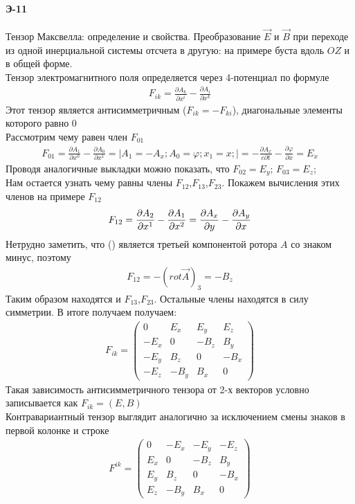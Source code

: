 \documentclass[__main__.tex]{subfiles}
\begin{document}
\paragraph{Э-11}
Тензор Максвелла: определение и свойства. Преобразование $\vec E$ и $\vec B$ при переходе из одной инерциальной системы отсчета в другую: на примере буста вдоль $OZ$ и в общей форме.\\

Тензор электромагнитного поля определяется через 4-потенциал по формуле
\begin{gather*}
	F_{ik} = \frac{\partial A_k}{\partial x^i}-\frac{\partial A_i}{\partial x^k}
\end{gather*}
Этот тензор является антисимметричным ($F_{ik}=-F_{ki}$), диагональные элементы которого равно 0\\
Рассмотрим чему равен член $F_{01}$
\begin{gather*}
F_{01} = \frac{\partial A_1}{\partial x^0}-\frac{\partial A_0}{\partial x^1}=\bigg|A_1=-A_x;A_0=\varphi;x_1=x;\bigg|= -\frac{\partial A_x}{c\partial t}-\frac{\partial \varphi}{\partial x} = E_x
\end{gather*}
Проводя аналогичные выкладки можно показать, что $\displaystyle F_{02} = E_y$; $\displaystyle F_{03} = E_z$;\\
Нам остается узнать чему равны члены $F_{12}$,$F_{13}$,$F_{23}$. Покажем вычисления этих членов на примере $F_{12}$  
\begin{gather}
\llabel{e-11_1}
	F_{12} = \frac{\partial A_2}{\partial x^1}-\frac{\partial A_1}{\partial x^2} = \frac{\partial A_x}{\partial y}-\frac{\partial A_y}{\partial x}
\end{gather}
Нетрудно заметить, что () является третьей компонентой ротора $A$ со знаком минус, поэтому 
\begin{gather*}
	F_{12} = -\left(rot\vec A\right)_3=-B_z
\end{gather*}
Таким образом находятся и  $F_{13}$,$F_{23}$. Остальные члены находятся в силу симметрии. В итоге получаем получаем:
\begin{gather*}
	F_{ik} = \begin{pmatrix}
	0 & E_x & E_y & E_z \\
	-E_x & 0 & -B_z & B_y \\         
	-E_y & B_z & 0 & -B_x \\
	-E_z & -B_y & B_x & 0
	\end{pmatrix}
\end{gather*}
Такая зависимость антисимметричного тензора от 2-х векторов условно записывается как $F_{ik} = (E,B)$\\
Контравариантный тензор выглядит аналогично за исключением смены знаков в первой колонке и строке
\begin{gather*}
F^{ik} = \begin{pmatrix}
0 & -E_x & -E_y & -E_z \\
E_x & 0 & -B_z & B_y \\         
E_y & B_z & 0 & -B_x \\
E_z & -B_y & B_x & 0
\end{pmatrix}
\end{gather*}
\end{document}
